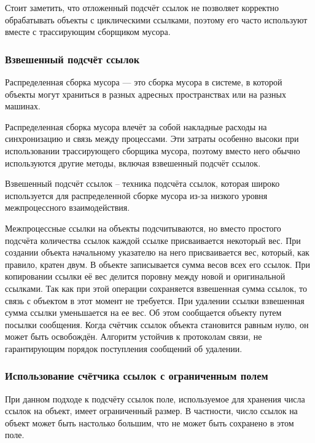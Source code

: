 Стоит заметить, что отложенный подсчёт ссылок не позволяет корректно обрабатывать объекты с циклическими ссылками, поэтому его часто используют вместе с трассирующим сборщиком мусора. \cite{recycling}

\subsubsection{Взвешенный подсчёт ссылок}

Распределенная сборка мусора \cite{glossary} --- это сборка мусора в системе, в которой объекты могут храниться в разных адресных пространствах или на разных машинах. 

Распределенная сборка мусора влечёт за собой накладные расходы на синхронизацию и связь между процессами. Эти затраты особенно высоки при использовании трассирующего сборщика мусора, поэтому вместо него обычно используются другие методы, включая взвешенный подсчёт ссылок. \cite{glossary}

Взвешенный подсчёт ссылок \cite{glossary} -- техника подсчёта ссылок, которая широко используется для распределенной сборке мусора из-за низкого уровня межпроцессного взаимодействия.

Межпроцессные ссылки на объекты подсчитываются, но вместо простого подсчёта количества ссылок каждой ссылке присваивается некоторый вес. При создании объекта начальному указателю на него присваивается вес, который, как правило, кратен двум. В объекте записывается сумма весов всех его ссылок. При копировании ссылки её вес делится поровну между новой и оригинальной ссылками. Так как при этой операции сохраняется взвешенная сумма ссылок, то связь с объектом в этот момент не требуется. При удалении ссылки взвешенная сумма ссылки уменьшается на ее вес. Об этом сообщается объекту путем посылки сообщения. Когда счётчик ссылок объекта становится равным нулю, он может быть освобождён. Алгоритм устойчив к протоколам связи, не гарантирующим порядок поступления сообщений об удалении. \cite{glossary}

\subsubsection{Использование счётчика ссылок с ограниченным полем}

При данном подходе к подсчёту ссылок поле, используемое для хранения числа ссылок на объект, имеет ограниченный размер. В частности, число ссылок на объект может быть настолько большим, что не может быть сохранено в этом поле. \cite{glossary}

